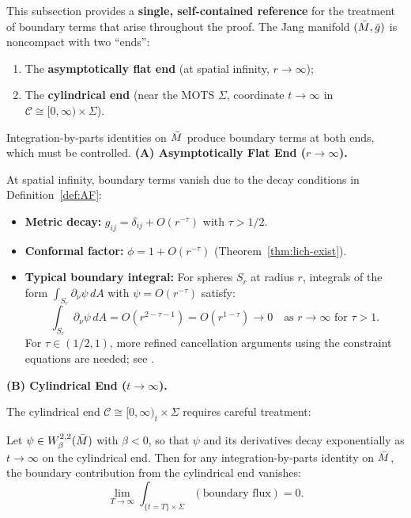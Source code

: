 This subsection provides a \textbf{single, self-contained reference} for the treatment of boundary terms that arise throughout the proof. The Jang manifold $(\bar{M}, \bar{g})$ is noncompact with two ``ends'':
\begin{enumerate}[label=(\roman*)]
    \item The \textbf{asymptotically flat end} (at spatial infinity, $r \to \infty$);
    \item The \textbf{cylindrical end} (near the MOTS $\Sigma$, coordinate $t \to \infty$ in $\mathcal{C} \cong [0,\infty) \times \Sigma$).
\end{enumerate}
Integration-by-parts identities on $\bar{M}$ produce boundary terms at both ends, which must be controlled.
\textbf{(A) Asymptotically Flat End ($r \to \infty$).}

At spatial infinity, boundary terms vanish due to the decay conditions in Definition~\ref{def:AF}:
\begin{itemize}
    \item \textbf{Metric decay:} $g_{ij} = \delta_{ij} + O(r^{-\tau})$ with $\tau > 1/2$.
    \item \textbf{Conformal factor:} $\phi = 1 + O(r^{-\tau})$ (Theorem~\ref{thm:lich-exist}).
    \item \textbf{Typical boundary integral:} For spheres $S_r$ at radius $r$, integrals of the form $\int_{S_r} \partial_\nu\psi \, dA$ with $\psi = O(r^{-\tau})$ satisfy:
    \[
    \int_{S_r} \partial_\nu\psi \, dA = O(r^{2-\tau-1}) = O(r^{1-\tau}) \to 0 \quad \text{as } r \to \infty \text{ for } \tau > 1.
    \]
    For $\tau \in (1/2, 1)$, more refined cancellation arguments using the constraint equations are needed; see \cite[Proposition 4.1]{bartnik1986}.
\end{itemize}

\textbf{(B) Cylindrical End ($t \to \infty$).}

The cylindrical end $\mathcal{C} \cong [0,\infty)_t \times \Sigma$ requires careful treatment:

\begin{lemma}\label{lem:cylindrical-boundary-vanishing}
Let $\psi \in W^{2,2}_\beta(\bar{M})$ with $\beta < 0$, so that $\psi$ and its derivatives decay exponentially as $t \to \infty$ on the cylindrical end. Then for any integration-by-parts identity on $\bar{M}$, the boundary contribution from the cylindrical end vanishes:
\[
\lim_{T \to \infty} \int_{\{t = T\} \times \Sigma} (\text{boundary flux}) = 0.
\]
\end{lemma}

